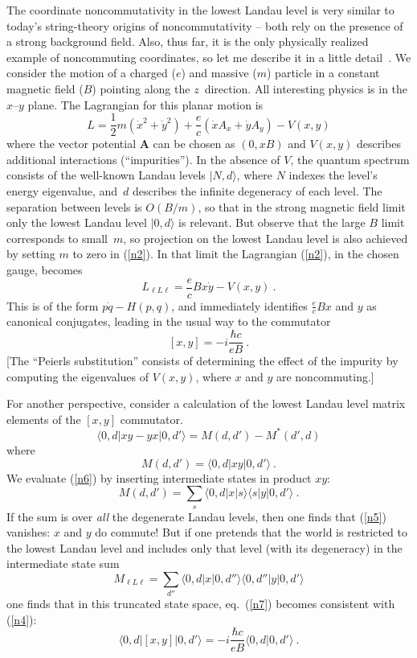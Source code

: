 \documentclass[a4paper,12pt,twoside]{article}
\newcommand{\fract}[2]{{\textstyle\frac{#1}{#2}}}
\newcommand{\vA}{\vec A}
\newcommand{\bra}[1]{\bigl\langle #1 \bigr| }
\newcommand{\ket}[1]{\bigl| #1 \bigr\rangle}
\newcommand{\braket}[2]{\bigl\langle #1 \big|  #2 \bigr\rangle}
\newcommand{\numeq}[2]{\begin{equation}
#2
\label{#1}
\end{equation}}
\newcommand{\refeq}[1]{(\ref{#1})}
\let\vec\boldsymbol
\begin{document}
The coordinate noncommutativity in the lowest Landau level is very similar to today's
string-theory origins of noncommutativity -- both rely on the presence of a strong
background field. Also, thus far, it is the only physically realized example of noncommuting
coordinates, so let me describe it in a little detail~\cite{r2}.
We consider the motion of a charged ($e$) and massive ($m$) particle in a constant magnetic
field ($B$) pointing along the $z$~direction.  All interesting physics is in the $x$--$y$ plane. The
Lagrangian for this planar motion is
\numeq{n2}{
L = \fract12 m(\dot x^2 +\dot y^2) + \frac ec (\dot x A_x + \dot y A_y) - V(x,y) 
}
where the vector potential $\vA$ can be chosen as $(0, xB)$ and $V(x,y)$ describes additional
interactions (``impurities''). In the absence of $V$, the quantum spectrum consists of the
well-known Landau levels $\ket{N,d}$, where $N$ indexes the level's energy eigenvalue,
and~$d$ describes the infinite degeneracy of each level. The separation between levels is
$O(B/m)$, so that in the strong magnetic field limit only the lowest Landau level $\ket{0,d}$ is
relevant. But observe that the large $B$ limit corresponds to small~$m$, so projection on the
lowest Landau level is also achieved by setting $m$ to zero in \refeq{n2}. In that limit the
Lagrangian \refeq{n2}, in the chosen gauge, becomes
\numeq{n3}{
L_{\ell L\ell} = \frac ec Bx\dot y - V(x,y)\ . 
}
This is of the form $p\dot q - H(p,q)$, and immediately identifies $\frac ec Bx$ and $y$ as
canonical conjugates, leading in the usual way to the commutator
\numeq{n4}{
[x,y] = - i \frac{\hbar c}{eB}\ .
}
[The ``Peierls substitution'' consists of determining the effect of the impurity by computing the
eigenvalues of $V(x,y)$, where $x$ and $y$ are noncommuting.]

For another perspective, consider a calculation of the lowest Landau level  matrix elements of
the $[x,y]$ commutator. 
\numeq{n5}{
\bra{0,d} xy - yx \ket{0,d'} = M(d,d') - M^* (d',d)
}
where
\numeq{n6}{
 M(d,d') = \bra{0,d} xy \ket{0,d'} \ .
}
We evaluate \refeq{n6} by inserting intermediate states in product $xy$:
\numeq{n7}{
 M(d,d') = \sum_s \bra{0,d} x  \ket{s} \bra{s}  y \ket{0,d'}\ . 
}
If the sum is over \emph{all} the degenerate Landau levels, then one finds that \refeq{n5}
vanishes: $x$ and $y$ do commute! But if one pretends that the world is restricted to the
lowest Landau level and includes only that level (with its degeneracy) in the intermediate
state sum 
\numeq{n8}{
M_{\ell L\ell} = \sum_{d''} \bra{0,d} x  \ket{0,d''} \bra{0,d''}  y \ket{0,d'}
}
one finds that in this truncated state space, eq.~\refeq{n7} becomes consistent with \refeq{n4}:
\numeq{n9}{
\bra{0,d} [x,y] \ket{0,d'} = -i \frac{\hbar c}{eB} \braket{0,d}{0,d'} \ . 
}
\end{document}
